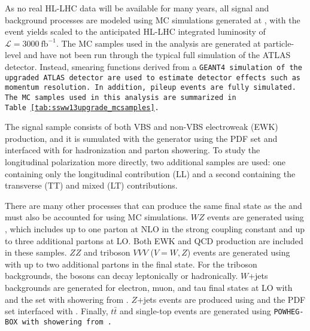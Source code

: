 As no real HL-LHC data will be available for many years, all signal and background processes are modeled using MC simulations generated at , with the event yields scaled to the anticipated HL-LHC integrated luminosity of $\mathcal{L}=3000~\textrm{fb}^{-1}$.
The MC samples used in the analysis are generated at particle-level and have not been run through the typical full simulation of the ATLAS detector.
Instead, smearing functions derived from a \tt{GEANT4} simulation of the upgraded ATLAS detector are used to estimate detector effects such as momentum resolution.
In addition, pileup events are fully simulated.
The MC samples used in this analysis are summarized in Table~\ref{tab:ssww13upgrade_mcsamples}.

The signal sample consists of both VBS and non-VBS electroweak (EWK) \ssww production, and it is sumulated with the \mcatnlo generator using the \nnpdf PDF set and interfaced with  \cite{2015.pythia82} for hadronization and parton showering.
To study the longitudinal polarization more directly, two additional \mcatnlo \ssww samples are used: one containing only the longitudinal contribution (LL) and a second containing the transverse (TT) and mixed (LT) contributions.

There are many other processes that can produce the same final state as the \ssww and must also be accounted for using MC simulations.
$WZ$ events are generated using , which includes up to one parton at NLO in the strong coupling constant and up to three additional partons at LO.  
Both EWK and QCD production are included in these samples.
$ZZ$ and triboson $VVV$ ($V = W,Z$) events are generated using  with up to two additional partons in the final state.
For the triboson backgrounds, the bosons can decay leptonically or hadronically.
$W$+jets backgrounds are generated for electron, muon, and tau final states at LO with \mcatnlo and the \nnpdf set with showering from .
$Z$+jets events are produced using  and the \ctten PDF set interfaced with .
Finally, $t\bar{t}$ and single-top events are generated using \tt{POWHEG-BOX} with showering from .



